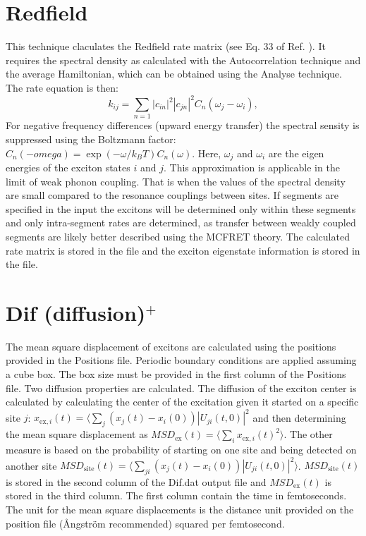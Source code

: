 \section{Redfield}
This technique claculates the Redfield rate matrix (see Eq. 33 of Ref. ).
It requires the spectral density as calculated with the Autocorrelation technique and the average Hamiltonian, which can be obtained using the Analyse technique.
The rate equation is then:
\begin{equation}
	k_{ij}=\sum_{n=1} |c_{in}|^2|c_{jn}|^2 C_n(\omega_j-\omega_i),
\end{equation}
For negative frequency differences (upward energy transfer) the spectral sensity is suppressed using the Boltzmann factor: $C_n(-omega)=\exp(-\omega/k_B T)C_n(\omega)$.
Here, $\omega_j$ and $\omega_i$ are the eigen energies of the exciton states $i$ and $j$.
This approximation is applicable in the limit of weak phonon coupling.
That is when the values of the spectral density are small compared to the resonance couplings between sites.
If segments are specified in the input the excitons will be determined only within these segments and only intra-segment rates are determined,
as transfer between weakly coupled segments are likely better described using the MCFRET theory. 
The calculated rate matrix is stored in the file  and the exciton eigenstate information is
stored in the  file.

\section{Dif (diffusion)$^{+}$}
The mean square displacement of excitons are calculated using the positions provided in the Positions file. Periodic boundary conditions are applied assuming a cube box. The box size must be provided in the first column of the Positions file.
Two diffusion properties are calculated. The diffusion of the exciton center is calculated by calculating the center of the excitation given it started on a specific site $j$: $x_{\textrm{ex},i}(t)=\langle \sum_j (x_j(t)-x_i(0)) |U_{ji}(t,0)|^2$ and then determining the mean square displacement as $MSD_{\textrm{ex}}(t)=\langle \sum_i  x_{\textrm{ex},i}(t)^2\rangle$. The other measure is based on the probability of starting on one site and being detected on another site $MSD_{\textrm{site}}(t)=\langle \sum_{ji} (x_j(t)-x_i(0))|U_{ji}(t,0)|^2\rangle$. $MSD_{\textrm{site}}(t)$ is stored in the second column of the Dif.dat output file and $MSD_{\textrm{ex}}(t)$ is stored in the third column. The first column contain the time in femtoseconds. The unit for the mean square displacements is the distance unit provided on the position file (\AA ngstr\"{o}m recommended) squared per femtosecond. 

